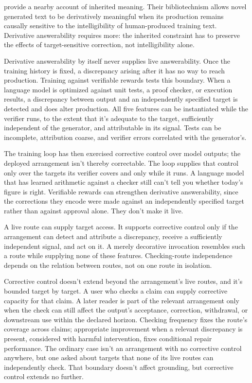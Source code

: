 \documentclass[12pt]{article}
\begin{document}
\textcite{lederman_mahowald_2024_bibliotechnism} provide a nearby account of inherited
meaning. Their bibliotechnism allows novel generated text to be derivatively meaningful
when its production remains causally sensitive to the intelligibility of human-produced
training text. Derivative answerability requires more: the inherited constraint has to
preserve the effects of target-sensitive correction, not intelligibility alone.

Derivative answerability by itself never supplies live answerability. Once the training history is
fixed, a discrepancy arising after it has no way to reach production. Training against
verifiable rewards tests this boundary. When a language model is optimized against unit
tests, a proof checker, or execution results, a discrepancy between output and an
independently specified target is detected and does alter production. All five features can
be instantiated while the verifier runs, to the extent that it's adequate to the target,
sufficiently independent of the generator, and attributable in its signal. Tests can be
incomplete, attribution coarse, and verifier errors correlated with the generator's.

The training loop has then exercised corrective control over model outputs; the deployed
arrangement isn't thereby correctable. The loop supplies that control only over the targets its
verifier covers and only while it runs. A language model that has
learned arithmetic against a checker still can't tell you whether today's figure is right.
Verifiable rewards can strengthen derivative answerability, since the corrections they
encode were made against an independently specified target rather than against approval alone.
They don't make it live.

A live route can supply target access. It supports corrective control only if the
arrangement can detect and attribute a discrepancy, receive a sufficiently independent
signal, and act on it. A merely decorative invocation resembles such a route while
supplying none of these features. Checking-route independence depends on the relation
between routes, not on one route in isolation.

Corrective control doesn't extend beyond the arrangement's live routes, and it's bounded
target by target. A user who checks a claim can supply corrective capacity for that claim.
A later reader is part of the relevant arrangement only when the check can still affect the
output's acceptance, correction, withdrawal, or downstream use within the declared horizon.
Checking frequency fixes the route's coverage across claims; appropriate
improvement when a relevant discrepancy is present, considered with harmful intervention,
fixes conditional repair performance. The ordinary case isn't an arrangement with no
corrective control anywhere, but one
asked about targets that none of its live routes can independently check. That boundary
doesn't affect grounding, but corrective control extends no further.
\end{document}
